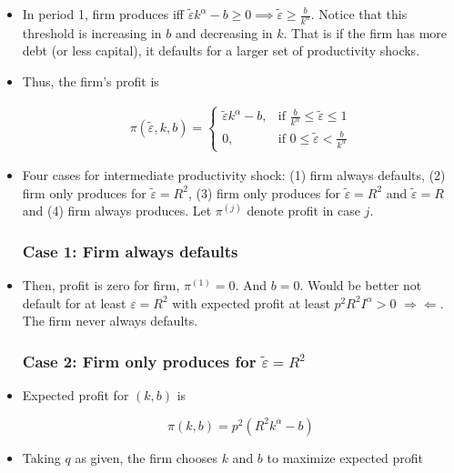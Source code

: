 \documentclass{article}
\begin{document}
\begin{itemize}

\item In period 1, firm produces iff $\tilde \varepsilon k^\alpha - b \ge 0 \implies \tilde \varepsilon \ge \frac{b}{k^\alpha}$. Notice that this threshold is increasing in $b$ and decreasing in $k$. That is if the firm has more debt (or less capital), it defaults for a larger set of productivity shocks.

\item Thus, the firm's profit is

\begin{align*}
\pi(\tilde \varepsilon, k, b) 
=
\begin{cases} 
\tilde \varepsilon k^\alpha - b, & \text{if }  \frac{b}{k^\alpha} \le \tilde\varepsilon \le 1 \\ 
0, & \text{if } 0 \le \tilde\varepsilon < \frac{b}{k^\alpha} 
\end{cases}
\end{align*}

\item Four cases for intermediate productivity shock: (1) firm always defaults, (2) firm only produces for $\tilde \varepsilon = R^2$, (3) firm only produces for $\tilde \varepsilon = R^2$ and $\tilde \varepsilon = R$ and (4) firm always produces. Let $\pi^{(j)}$ denote profit in case $j$.

\subsubsection*{Case 1: Firm always defaults}

\item Then, profit is zero for firm, $\pi^{(1)} = 0$. And $b=0$. Would be better not default for at least $\varepsilon = R^2$ with expected profit at least $p^2 R^2 I^\alpha > 0$ $\Rightarrow \Leftarrow$. The firm never always defaults.

\subsubsection*{Case 2: Firm only produces for $\tilde\varepsilon = R^2$}

\item Expected profit for $(k,b)$ is

$$
\pi(k, b) = p^2 (R^2 k^\alpha - b)
$$

\item Taking $q$ as given, the firm chooses $k$ and $b$ to maximize expected profit


\end{itemize}
\end{document}
